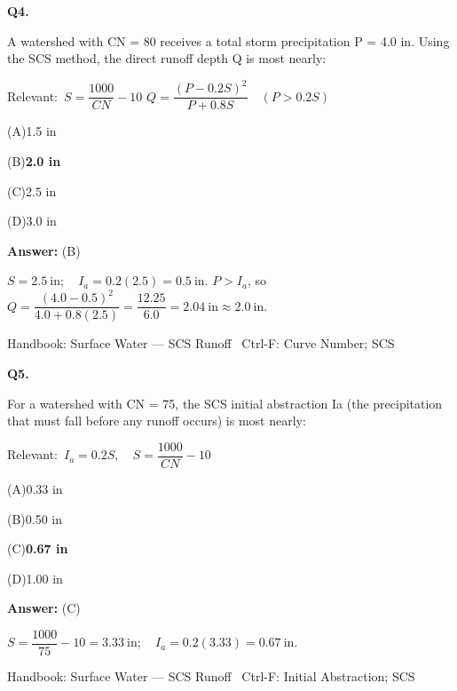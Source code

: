 \documentclass[11pt]{article}
\newcommand{\correct}[1]{\textbf{#1}\;{\color{accent}$\checkmark$}}
\newcommand{\optline}[2]{\par\noindent\hspace{1.2em}(#1)\hspace{0.6em}#2}
\begin{document}
\vspace{9pt}
\filbreak
\textbf{\color{accent}Q4.}\par\vspace{2pt}
A watershed with CN = 80 receives a total storm precipitation P = 4.0 in. Using the SCS method, the direct runoff depth Q is most nearly:\par\vspace{3pt}
{\small\color{soft}Relevant:}\ $S = \dfrac{1000}{CN} - 10$ \quad $Q = \dfrac{(P - 0.2S)^{2}}{P + 0.8S}\quad(P > 0.2S)$\par\vspace{3pt}
\optline{A}{1.5 in}
\optline{B}{\correct{2.0 in}}
\optline{C}{2.5 in}
\optline{D}{3.0 in}
\par\vspace{3pt}
\vspace{2pt}\par\noindent\colorbox{boxbg}{\parbox{\dimexpr\linewidth-2\fboxsep\relax}{%
\vspace{2pt}\textbf{Answer:} (B)\par\vspace{2pt}
{\small $S = 2.5\ \mathrm{in};\quad I_a = 0.2(2.5) = 0.5\ \mathrm{in}$. $P > I_a$, so $Q = \dfrac{(4.0 - 0.5)^{2}}{4.0 + 0.8(2.5)} = \dfrac{12.25}{6.0} = 2.04\ \mathrm{in} \approx 2.0\ \mathrm{in}$.}\par\vspace{2pt}
{\footnotesize\color{soft}Handbook: Surface Water --- SCS Runoff \textbullet\ Ctrl-F: Curve Number; SCS}\vspace{2pt}
}}
\vspace{9pt}
\filbreak
\textbf{\color{accent}Q5.}\par\vspace{2pt}
For a watershed with CN = 75, the SCS initial abstraction Ia (the precipitation that must fall before any runoff occurs) is most nearly:\par\vspace{3pt}
{\small\color{soft}Relevant:}\ $I_a = 0.2S,\quad S = \dfrac{1000}{CN} - 10$\par\vspace{3pt}
\optline{A}{0.33 in}
\optline{B}{0.50 in}
\optline{C}{\correct{0.67 in}}
\optline{D}{1.00 in}
\par\vspace{3pt}
\vspace{2pt}\par\noindent\colorbox{boxbg}{\parbox{\dimexpr\linewidth-2\fboxsep\relax}{%
\vspace{2pt}\textbf{Answer:} (C)\par\vspace{2pt}
{\small $S = \dfrac{1000}{75} - 10 = 3.33\ \mathrm{in};\quad I_a = 0.2(3.33) = 0.67\ \mathrm{in}$.}\par\vspace{2pt}
{\footnotesize\color{soft}Handbook: Surface Water --- SCS Runoff \textbullet\ Ctrl-F: Initial Abstraction; SCS}\vspace{2pt}
}}
\end{document}
